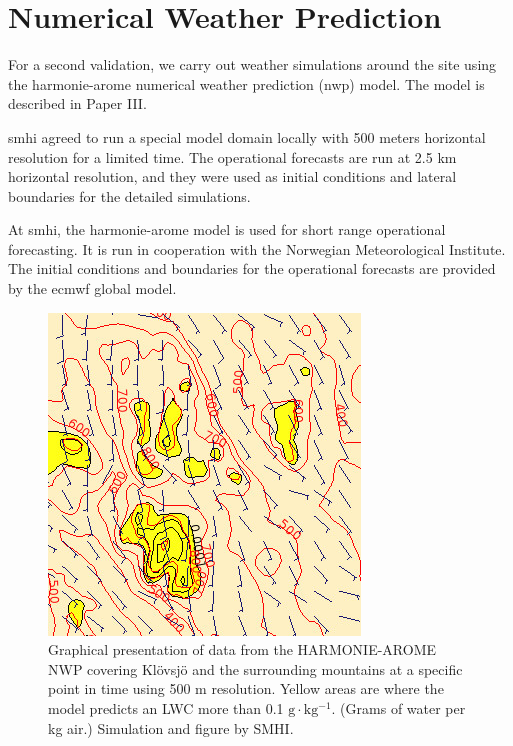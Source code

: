 \section{Numerical Weather Prediction}

For a second validation, we carry out weather simulations around the site using the \gls{harmonie}-\gls{arome} numerical weather prediction (\gls{nwp}) model. The model is described in Paper III.

\gls{smhi} agreed to run a special model domain locally with 500 meters horizontal resolution for a limited time. The operational forecasts are run at 2.5 km horizontal resolution, and they were used as initial conditions and lateral boundaries for the detailed simulations.

At \gls{smhi}, the \gls{harmonie}-\gls{arome} model is used for short range operational forecasting. It is run in cooperation with the Norwegian Meteorological Institute. The initial conditions and boundaries for the operational forecasts are provided by the \gls{ecmwf} global model.

\begin{figure}%
\centering\includegraphics[width=0.6\linewidth]{figures/Images/Klovsjo_smhi160923_small}
\caption{Graphical presentation of data from the HARMONIE-AROME NWP covering Klövsjö and the surrounding mountains at a specific point in time using 500 m resolution. Yellow areas are where the model predicts an LWC more than 0.1 $\mathrm{g \cdot kg^{-1}}$. (Grams of water per kg air.) Simulation and figure by SMHI.}
\end{figure}



